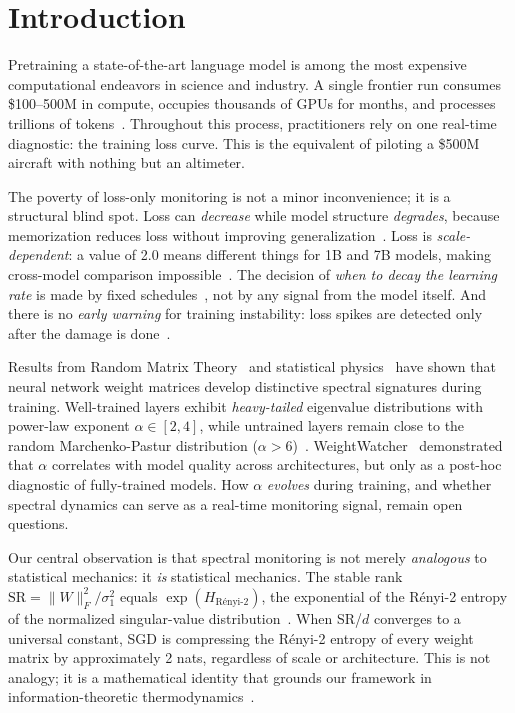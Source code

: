 \section{Introduction}
\label{sec:intro}

Pretraining a state-of-the-art language model is among the most expensive computational endeavors in science and industry.
A single frontier run consumes \$100--500M in compute, occupies thousands of GPUs for months, and processes trillions of tokens~\citep{deepseekv3, llama4, olmo2}.
Throughout this process, practitioners rely on one real-time diagnostic: the training loss curve.
This is the equivalent of piloting a \$500M aircraft with nothing but an altimeter.

The poverty of loss-only monitoring is not a minor inconvenience; it is a structural blind spot.
Loss can \emph{decrease} while model structure \emph{degrades}, because memorization reduces loss without improving generalization~\citep{overtraining_fragile2025}.
Loss is \emph{scale-dependent}: a value of 2.0 means different things for 1B and 7B models, making cross-model comparison impossible~\citep{hoffmann2022}.
The decision of \emph{when to decay the learning rate} is made by fixed schedules~\citep{wsd_schedule, li_schedules2026}, not by any signal from the model itself.
And there is no \emph{early warning} for training instability: loss spikes are detected only after the damage is done~\citep{deepseekv3, spectral_alignment2025}.

Results from Random Matrix Theory~\citep{martin_mahoney_jmlr2021, pennington2017, marchenko_pastur1967} and statistical physics~\citep{sadrtdinov2025, liu_tegmark2025, liu_ziyin_neurips2025} have shown that neural network weight matrices develop distinctive spectral signatures during training.
Well-trained layers exhibit \emph{heavy-tailed} eigenvalue distributions with power-law exponent $\alpha \in [2, 4]$, while untrained layers remain close to the random Marchenko-Pastur distribution ($\alpha > 6$)~\citep{martin_mahoney_jmlr2021}.
WeightWatcher~\citep{weightwatcher} demonstrated that $\alpha$ correlates with model quality across architectures, but only as a post-hoc diagnostic of fully-trained models.
How $\alpha$ \emph{evolves} during training, and whether spectral dynamics can serve as a real-time monitoring signal, remain open questions.

Our central observation is that spectral monitoring is not merely \emph{analogous} to statistical mechanics: it \emph{is} statistical mechanics.
The stable rank $\mathrm{SR} = \|W\|_F^2 / \sigma_1^2$ equals $\exp(H_{\text{R\'{e}nyi-2}})$, the exponential of the R\'{e}nyi-2 entropy of the normalized singular-value distribution~\citep{high_entropy_npj2026}.
When SR/$d$ converges to a universal constant, SGD is compressing the R\'{e}nyi-2 entropy of every weight matrix by approximately 2 nats, regardless of scale or architecture.
This is not analogy; it is a mathematical identity that grounds our framework in information-theoretic thermodynamics~\citep{wilson_compression_icml2025}.

